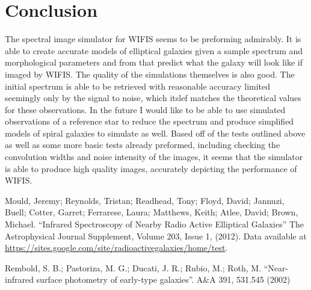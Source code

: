 \documentclass[11pt,twoside]{article}
\begin{document}
\section{Conclusion}
The spectral image simulator for WIFIS seems to be preforming admirably. It is able to create accurate models of elliptical galaxies given a sample spectrum and morphological parameters and from that predict what the galaxy will look like if imaged by WIFIS. The quality of the simulations themselves is also good. The initial spectrum is able to be retrieved with reasonable accuracy limited seemingly only by the signal to noise, which itslef matches the theoretical values for these observations. In the future I would like to be able to use simulated observations of a reference star to reduce the spectrum and produce simplified models of spiral galaxies to simulate as well. Based off of the tests outlined above as well as some more basic tests already preformed, including checking the convolution widths and noise intensity of the images, it seems that the simulator is able to produce high quality images, accurately depicting the performance of WIFIS.

\begin{thebibliography}{9}



Mould, Jeremy; Reynolds, Tristan; Readhead, Tony; Floyd, David; Jannuzi, Buell; Cotter, Garret; Ferrarese, Laura; Matthews, Keith; Atlee, David; Brown, Michael. ``Infrared Spectroscopy of Nearby Radio Active Elliptical Galaxies'' The Astrophysical Journal Supplement, Volume 203, Issue 1, (2012). Data available at \url{https://sites.google.com/site/radioactivegalaxies/home/test}.

Rembold, S. B.; Pastoriza,  M. G.; Ducati, J. R.; Rubio, M.; Roth, M. ``Near-infrared surface photometry of early-type galaxies''. A\&A 391, 531.545 (2002)


\end{thebibliography}
\end{document}
